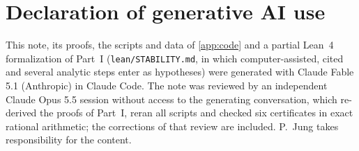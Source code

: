 \documentclass[11pt,a4paper]{article}
\theoremstyle{plain}
\theoremstyle{definition}
\theoremstyle{remark}
\numberwithin{equation}{section}
\begin{document}
\section*{Declaration of generative AI use}
This note, its proofs, the scripts and data of \cref{app:code} and a partial Lean~4 formalization of Part~I (\texttt{lean/STABILITY.md}, in which computer-assisted, cited and several analytic steps enter as hypotheses) were generated with Claude Fable 5.1 (Anthropic) in Claude Code. The note was reviewed by an independent Claude Opus 5.5 session without access to the generating conversation, which re-derived the proofs of Part~I, reran all scripts and checked six certificates in exact rational arithmetic; the corrections of that review are included. P.~Jung takes responsibility for the content.



\end{document}
